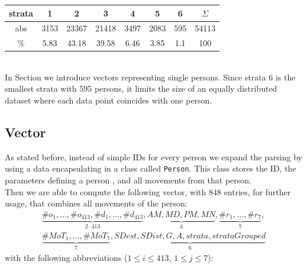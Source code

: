 \documentclass[runningheads]{llncs}
\begin{document}
	{\hspace*{2cm}\setlength\tabcolsep{.2cm}\begin{tabular}{c|ccccccc}
		strata &  1   &   2   &   3   &  4   &  5   &  6  & $\Sigma$ \\ \hline
		 abs   & 3153 & 23367 & 21418 & 3497 & 2083 & 595 &  54113   \\
		  \%   & 5.83 & 43.18 & 39.58 & 6.46 & 3.85 & 1.1 &   100
	\end{tabular}}\\
	In Section  we introduce vectors representing single persons. Since strata 6 is the smallest strata with 595 persons, it limits the size of an equally distributed dataset where each data point coincides with one person.
	
	\subsection{Vector}\label{subsec: person vector data}
	As stated before, instead of simple IDs for every person we expand the parsing by using a data encapsulating in a class called \texttt{Person}. This class stores the ID, the parameters defining a person %
	, and all movements from that person.\\
	Then we are able to compute the following vector, with 848 entries, for further usage, that combines all movements of the person:
	\begin{align*}
	\underbrace{\#o_1, \dots, \#o_{413}, \#d_1, \dots, \#d_{413}}_{2\cdot 413} ,
	\underbrace{\mathit{AM}, \mathit{MD}, \mathit{PM}, \mathit{MN}}_{4}, 
	\underbrace{\#r_1, \dots, \#r_7}_{7}, \\
	\underbrace{\#\mathit{MoT}_1, \dots, \#\mathit{MoT}_7}_{7}, \underbrace{\mathit{SDest}, \mathit{SDist}, \mathit{G}, \mathit{A} ,\mathit{strata}, \mathit{strataGrouped}}_{6}
	\end{align*}
	with the following abbreviations ($1 \le i \le 413$, $1 \le j \le 7$):
\end{document}
